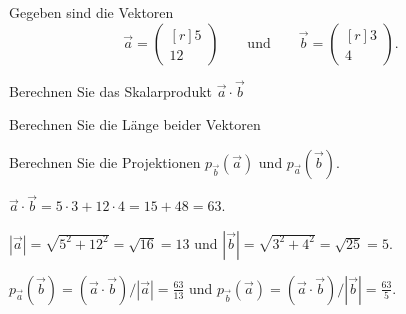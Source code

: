 Gegeben sind die Vektoren
\[
\vec{a}
=
\begin{pmatrix*}[r] 5 \\ 12\end{pmatrix*}
\qquad\text{und}\qquad
\vec{b}
=
\begin{pmatrix*}[r] 3 \\ 4 \end{pmatrix*}.
\]
\begin{teilaufgaben}
\item Berechnen Sie das Skalarprodukt $\vec{a}\cdot\vec{b}$
\item Berechnen Sie die Länge beider Vektoren
\item Berechnen Sie die Projektionen
$p_{\vec{b}}(\vec{a})$
und
$p_{\vec{a}}(\vec{b})$.
\end{teilaufgaben}

\begin{loesung}
\begin{teilaufgaben}
\item $\vec{a}\cdot\vec{b}=5\cdot 3 + 12\cdot 4 = 15+48=63$.
\item
$|\vec{a}| = \!\sqrt{5^2+12^2}=\!\sqrt{16}=13$
und
$|\vec{b}| = \!\sqrt{3^2+4^2}=\!\sqrt{25}=5$.
\item
$p_{\vec{a}}(\vec{b}) = (\vec{a}\cdot\vec{b})/|\vec{a}| = \frac{63}{13}$
und
$p_{\vec{b}}(\vec{a}) = (\vec{a}\cdot\vec{b})/|\vec{b}| = \frac{63}{5}$.
\qedhere
\end{teilaufgaben}
\end{loesung}
